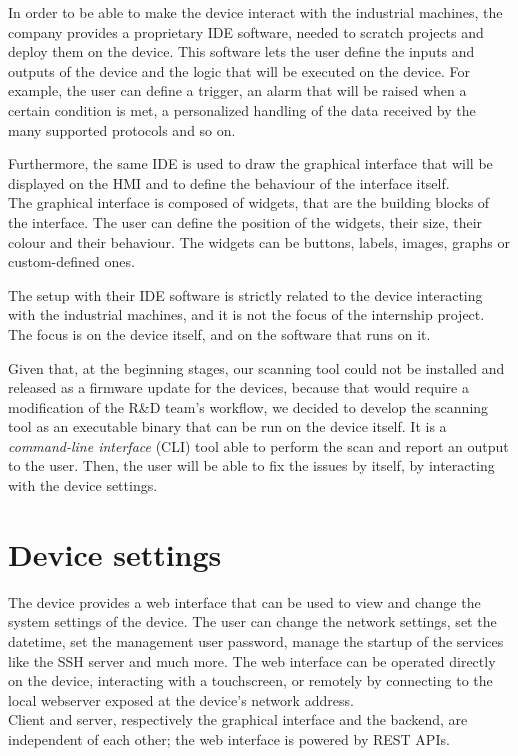 In order to be able to make the device interact with the industrial machines, the company provides a proprietary IDE software, needed to scratch projects and deploy them on the device. This software lets the user define the inputs and outputs of the device and the logic that will be executed on the device. For example, the user can define a trigger, an alarm that will be raised when a certain condition is met, a personalized handling of the data received by the many supported protocols and so on.

Furthermore, the same IDE is used to draw the graphical interface that will be displayed on the HMI and to define the behaviour of the interface itself.\\
The graphical interface is composed of widgets, that are the building blocks of the interface. The user can define the position of the widgets, their size, their colour and their behaviour. The widgets can be buttons, labels, images, graphs or custom-defined ones.

The setup with their IDE software is strictly related to the device interacting with the industrial machines, and it is not the focus of the internship project. The focus is on the device itself, and on the software that runs on it.

Given that, at the beginning stages, our scanning tool could not be installed and released as a firmware update for the devices, because that would require a modification of the R\&D team's workflow, we decided to develop the scanning tool as an executable binary that can be run on the device itself. It is a \textit{command-line interface} (CLI) tool able to perform the scan and report an output to the user. Then, the user will be able to fix the issues by itself, by interacting with the device settings.

\section{Device settings}

The device provides a web interface that can be used to view and change the system settings of the device. The user can change the network settings, set the datetime, set the management user password, manage the startup of the services like the SSH server and much more. The web interface can be operated directly on the device, interacting with a touchscreen, or remotely by connecting to the local webserver exposed at the device's network address. \\
Client and server, respectively the graphical interface and the backend, are independent of each other; the web interface is powered by REST APIs.

